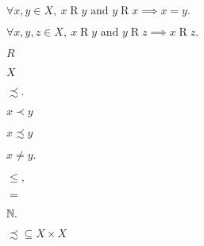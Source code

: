 \documentclass[10pt]{book}
\begin{document}
\begin{mdSnippets}
\begin{mdInlineSnippet}[f897646f6a691529aa25d6aa9c357b69]%
$\forall x,y \in X,\ x \mathrel{R} y \text{ and } y \mathrel{R} x \implies x = y.$\end{mdInlineSnippet}%
\begin{mdInlineSnippet}[91364f7f49530928b5a1330b4f51c399]%
$\forall x,y,z \in X,\ x \mathrel{R} y \text{ and } y \mathrel{R} z \implies x \mathrel{R} z.$\end{mdInlineSnippet}%
\begin{mdInlineSnippet}[e1e1d3d40573127e9ee0480caf1283d6]%
$R$\end{mdInlineSnippet}%
\begin{mdInlineSnippet}[02129bb861061d1a052c592e2dc6b383]%
$X$\end{mdInlineSnippet}%
\begin{mdInlineSnippet}%
$\precsim.$\end{mdInlineSnippet}%
\begin{mdInlineSnippet}[5df85ed45d6d30876280344b5a097b39]%
$x \prec y$\end{mdInlineSnippet}%
\begin{mdInlineSnippet}[301a825cb8f859789f0816615fd244a4]%
$x \precsim y$\end{mdInlineSnippet}%
\begin{mdInlineSnippet}[492b4004bf6a775d3f8a1f859e226888]%
$x \ne y.$\end{mdInlineSnippet}%
\begin{mdInlineSnippet}[7076f9d2217a9011fe0061d20db1418a]%
$\le,$\end{mdInlineSnippet}%
\begin{mdInlineSnippet}%
$=$\end{mdInlineSnippet}%
\begin{mdInlineSnippet}[3075f815d4c93294eab1f17f3f225b64]%
$\mathbb{N}.$\end{mdInlineSnippet}%
\begin{mdInlineSnippet}%
${\precsim} \subseteq X \times X$\end{mdInlineSnippet}%
\begin{mdInlineSnippet}[02129bb861061d1a052c592e2dc6b383]%

\end{mdInlineSnippet}
\end{mdSnippets}
\end{document}
